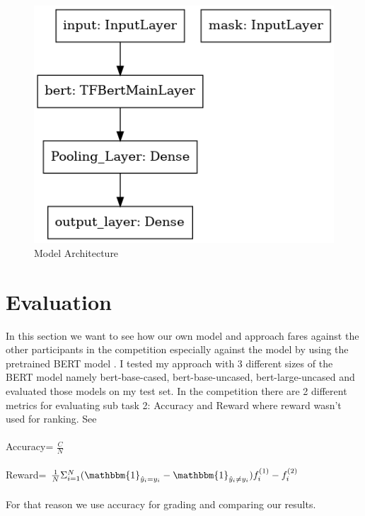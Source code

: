 \documentclass[11pt,a4paper,onecolumn,oneside,notitlepage]{article}
\begin{document}
	    \begin{figure}
		\begin{center}
			\includegraphics[width=1.0\linewidth]{model.png}
		\end{center}
		
		\caption{Model Architecture}\label{fig3}
	\end{figure}	
		
	\section{Evaluation}
    In this section we want to see how our own model and approach fares against the other participants in the competition especially against the model by \textcite{Bert1} using the pretrained BERT model .
    I tested my approach with 3 different sizes of the BERT model namely bert-base-cased, bert-base-uncased, bert-large-uncased and evaluated those models on my test set. In the competition there are 2 different metrics for evaluating sub task 2: Accuracy and Reward where reward wasn't used for ranking. See \textcite{Bert2}\\\\
    Accuracy= $\frac{C}{N}$\\\\
    Reward= $\frac{1}{N} \Sigma_{i=1}^N(\mathbbm{1}_{\hat{y}_i = y_i}- \mathbbm{1}_{\hat{y}_i \neq y_i}    ) f_i^{(1)} - f_i^{(2)} $\\\\
    For that reason we use accuracy for grading and comparing our results.
    
\end{document}
